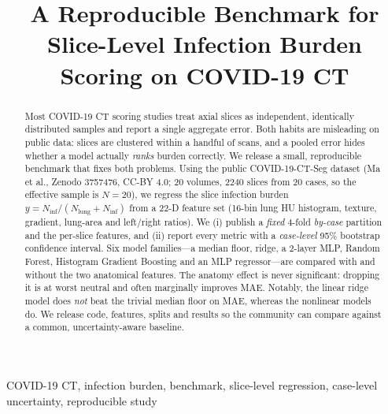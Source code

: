\documentclass[conference]{IEEEtran}
\begin{document}
\title{A Reproducible Benchmark for Slice-Level Infection Burden Scoring
on COVID-19 CT}

\author{
}

\maketitle

\begin{abstract}
Most COVID-19 CT scoring studies treat axial slices as independent, identically
distributed samples and report a single aggregate error. Both habits are
misleading on public data: slices are clustered within a handful of scans, and a
pooled error hides whether a model actually \emph{ranks} burden correctly. We
release a small, reproducible benchmark that fixes both problems. Using the
public COVID-19-CT-Seg dataset (Ma et al., Zenodo 3757476, CC-BY 4.0; 20
volumes, 2240 slices from 20 cases, so the effective sample is $N{=}20$), we
regress the slice infection burden $y=N_{\mathrm{inf}}/(N_{\mathrm{lung}}+N_{\mathrm{inf}})$
from a 22-D feature set (16-bin lung HU histogram, texture, gradient, lung-area
and left/right ratios). We (i) publish a \emph{fixed} 4-fold \emph{by-case}
partition and the per-slice features, and (ii) report every metric with a
\emph{case-level} 95\% bootstrap confidence interval. Six model families---a
median floor, ridge, a 2-layer MLP, Random Forest, Histogram Gradient Boosting
and an MLP regressor---are compared with and without the two anatomical
features. The anatomy effect is never significant: dropping it is at worst
neutral and often marginally improves MAE. Notably, the linear ridge model does
\emph{not} beat the trivial median floor on MAE, whereas the nonlinear models
do. We release code, features, splits and results so the community can compare
against a common, uncertainty-aware baseline.
\end{abstract}

\begin{IEEEkeywords}
COVID-19 CT, infection burden, benchmark, slice-level regression, case-level
uncertainty, reproducible study
\end{IEEEkeywords}
\end{document}
